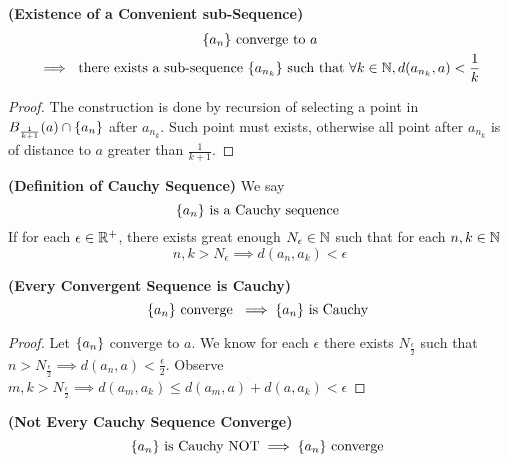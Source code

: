 \documentclass{report}
\begin{document}
\begin{theorem}
\label{1.1.9}
\textbf{(Existence of a Convenient sub-Sequence)} 
\begin{gather}
\{ a_n \}\text{ converge to }a\\
\implies  \text{ there exists a sub-sequence }\{ a_{n_k} \}  \text{ such that }\forall k\in\mathbb{N}, d(a_{n_k},a)<\frac{1}{k}
\end{gather}
\end{theorem}
\begin{proof}
The construction is done by recursion of selecting a point in $B_{\frac{1}{k+1}}(a)\cap \{ a_n \}$ after $a_{n_k}$. Such point must exists, otherwise all point after $a_{n_k}$ is of distance to $a$ greater than  $\frac{1}{k+1}$.
\end{proof}
\begin{definition}
\label{1.1.10}
\textbf{(Definition of Cauchy Sequence)} We say 
 \begin{equation}
\{ a_n \}\text{ is a Cauchy sequence }
\end{equation}
If for each $\epsilon \in\mathbb{R}^+$, there exists great enough $N_\epsilon \in\mathbb{N}$ such that for each $n,k\in\mathbb{N}$
\begin{equation}
n,k>N_\epsilon \implies d(a_n,a_k)<\epsilon 
\end{equation}
\end{definition}
\begin{theorem}
\label{1.1.11}
\textbf{(Every Convergent Sequence is Cauchy)}
\begin{equation}
\{ a_n \}\text{ converge }\implies \{ a_n \}\text{ is Cauchy }
\end{equation}
\end{theorem}
\begin{proof}
Let $\{ a_n \}$ converge to $a$. We know for each $\epsilon $ there exists $N_{\frac{\epsilon }{2} }$ such that $n>N_{\frac{\epsilon }{2}}\implies d(a_n,a)<\frac{\epsilon}{2}$. Observe $m,k>N_\frac{\epsilon }{2}\implies d(a_m,a_k)\leq d(a_m,a)+d(a,a_k)<\epsilon $
\end{proof}
\begin{theorem}
\label{1.1.12}
\textbf{(Not Every Cauchy Sequence Converge)} 
\begin{equation}
\{ a_n \}\text{ is Cauchy NOT}\implies \{ a_n \}\text{ converge }
\end{equation}
\end{theorem}
\end{document}
